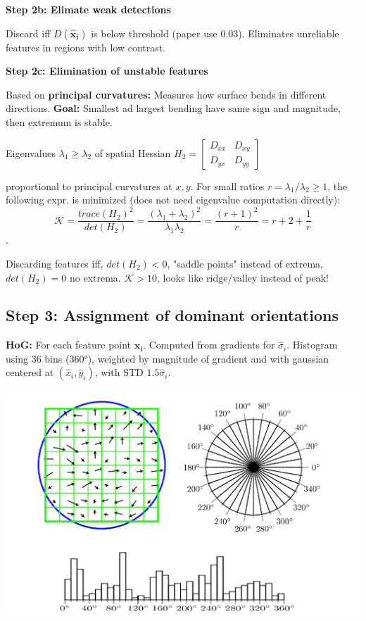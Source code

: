 \textbf{Step 2b: Elimate weak detections}

Discard iff $D(\mathbf{\hat{x}_i})$ is below threshold (paper use 0.03). Eliminates unreliable features in regions with low contrast.

\textbf{Step 2c: Elimination of unstable features}

Based on \textbf{principal curvatures:} Measures how surface bends in different directions. \textbf{Goal:} Smallest ad largest bending have same sign and magnitude, then extremum is stable.

Eigenvalues $\lambda_1 \geq \lambda_2$ of spatial Hessian $H_2 = \left[ \begin{matrix}
D_{xx} & D_{xy} \\
D_{yx} & D_{yy}
\end{matrix}\right]$

proportional to principal curvatures at $x,y$. For small ratios $r = \lambda_1 / \lambda_2 \geq 1$, the following expr. is minimized (does not need eigenvalue computation directly): $$\mathcal{K} = \dfrac{trace(H_2)^2}{det(H_2)} = \dfrac{(\lambda_1 + \lambda_2)^2}{\lambda_1\lambda_2} = \dfrac{(r+1)^2}{r} = r + 2 + \frac{1}{r}$$.

Discarding features iff, $det(H_2) < 0$, "saddle points" instead of extrema, $det(H_2) = 0$ no extrema. $\mathcal{K} > 10$, looks like ridge/valley instead of peak!

\subsection{Step 3: Assignment of dominant orientations}

\textbf{HoG:} For each feature point $\mathbf{x_i}$. Computed from gradients for $\hat{\sigma}_i$. Histogram using 36 bins (360°), weighted by magnitude of gradient and with gaussian centered at $(\hat{x}_i, \hat{y}_i)$, with STD $1.5\hat{\sigma}_i$.

\includegraphics[width=\textwidth]{images/chap5/HoG}

